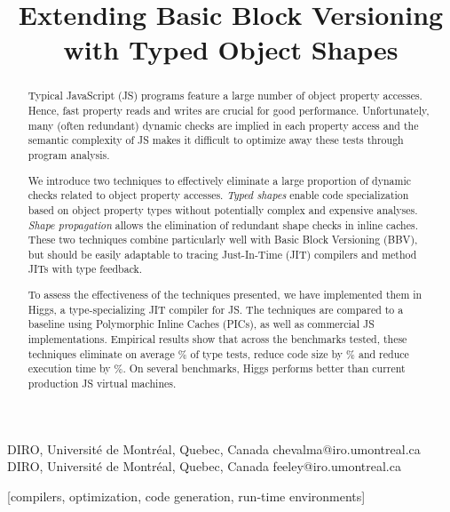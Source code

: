 \documentclass[preprint]{sigplanconf}
\newcommand{\stat}[1]{\unskip}
\newcommand{\percentstat}[1]{\unskip\%}
\begin{document}
\setlength{\pdfpageheight}{\paperheight}
\setlength{\pdfpagewidth}{\paperwidth}




\title{Extending Basic Block Versioning with Typed Object Shapes}


           {DIRO, Universit\'e de Montr\'eal, Quebec, Canada}
           {chevalma@iro.umontreal.ca}
           {DIRO, Universit\'e de Montr\'eal, Quebec, Canada}
           {feeley@iro.umontreal.ca}


\maketitle

[compilers, optimization, code generation, run-time environments]


\begin{abstract}
Typical JavaScript (JS) programs feature a large number of object property
accesses. Hence, fast property reads and writes are crucial for good
performance. Unfortunately, many (often redundant) dynamic checks are implied
in each property access and the semantic complexity of JS makes it difficult
to optimize away these tests through program analysis.

We introduce two techniques to effectively eliminate a large proportion of
dynamic checks related to object property accesses. {\em Typed shapes} enable
code specialization based on object property types without potentially
complex and expensive analyses. {\em Shape propagation} allows the elimination
of redundant shape checks in inline caches. These two techniques combine
particularly well with Basic Block Versioning (BBV), but should be easily
adaptable to tracing Just-In-Time (JIT) compilers and method JITs with type
feedback.

To assess the effectiveness of the techniques presented, we have implemented
them in Higgs, a type-specializing JIT compiler for JS. The techniques are
compared to a baseline using Polymorphic Inline Caches (PICs), as well as
commercial JS implementations. Empirical results show that across the
\stat{num_benchs} benchmarks tested, these
techniques eliminate on average \percentstat{testcounts_decr_maxshapes2} of
type tests, reduce code size by \percentstat{codesize_decr_maxshapes2} and
reduce execution time by \percentstat{exectime_decr_maxshapes2}. On several
benchmarks, Higgs performs better than current production JS virtual machines.

 \end{abstract}
\end{document}
